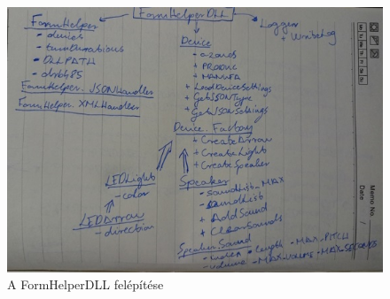 \documentclass[tocnopagenum]{thesis-ekf}
\begin{document}
	\begin{figure}[H]
		\centering
		\hspace*{-0.5in}
		\includegraphics[scale=0.75]{images/formhelper_kezi.jpg}
		\caption{A FormHelperDLL felépítése}
		\label{fig:formhelper_kezi}
	\end{figure}
	
\end{document}
